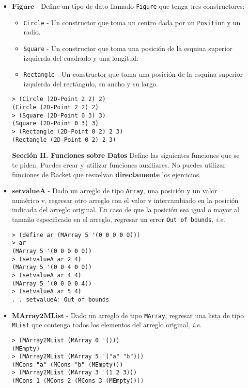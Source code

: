 \documentclass{article}
\begin{document}
\begin{itemize}
\item $\textbf{Figure}$ - Define un tipo de dato llamado
  \texttt{Figure}
  que tenga tres constructores:
  \begin{itemize}
    \item{\texttt{Circle} - Un constructor que toma un centro dada por un
      \texttt{Position} y un radio.}
    \item{\texttt{Square} - Un constructor que toma una posición de la
      esquina superior izquierda del cuadrado y una longitud.}
    \item{\texttt{Rectangle} - Un constructor que toma una posición de
    la esquina superior izquierda del rectángulo, su ancho y su largo.}
  \end{itemize}
\begin{verbatim}
> (Circle (2D-Point 2 2) 2)
(Circle (2D-Point 2 2) 2)
> (Square (2D-Point 0 3) 3)
(Square (2D-Point 0 3) 3)
> (Rectangle (2D-Point 0 2) 2 3)
(Rectangle (2D-Point 0 2) 2 3)
\end{verbatim}


\textbf{Sección II. Funciones sobre Datos} Define
las siguientes funciones que se te piden. Puedes crear y utilizar
funciones auxiliares. No puedes utilizar funciones de Racket que
resuelvan \textbf{directamente} los ejercicios.

\item $\textbf{setvalueA}$ - Dado un arreglo de tipo \texttt{Array},
  una posición y un valor numérico v, regresar otro arreglo con el
  valor v intercambiado en la posición indicada del arreglo original.
  En caso de que la posición sea igual o mayor al tamaño especificado
  en el arreglo, regresar un error \texttt{Out of bounds},
  \textit{i.e.}
\begin{verbatim}
> (define ar (MArray 5 '(0 0 0 0 0)))
> ar
(MArray 5 '(0 0 0 0 0))
> (setvalueA ar 2 4)
(MArray 5 '(0 0 4 0 0))
> (setvalueA ar 4 4)
(MArray 5 ’(0 0 0 0 4))
> (setvalueA ar 5 4)
. . setvalueA: Out of bounds
\end{verbatim}

\item $\textbf{MArray2MList}$ - Dado un arreglo de tipo \texttt{MArray},
  regresar una lista de tipo \texttt{MList} que contenga todos los
  elementos del arreglo original, \textit{i.e.}
\begin{verbatim}
> (MArray2MList (MArray 0 '()))
(MEmpty)
> (MArray2MList (MArray 5 '("a" "b")))
(MCons "a" (MCons "b" (MEmpty)))
> (MArray2MList (MArray 3 '(1 2 3)))
(MCons 1 (MCons 2 (MCons 3 (MEmpty))))
\end{verbatim}


\end{itemize}
\end{document}
